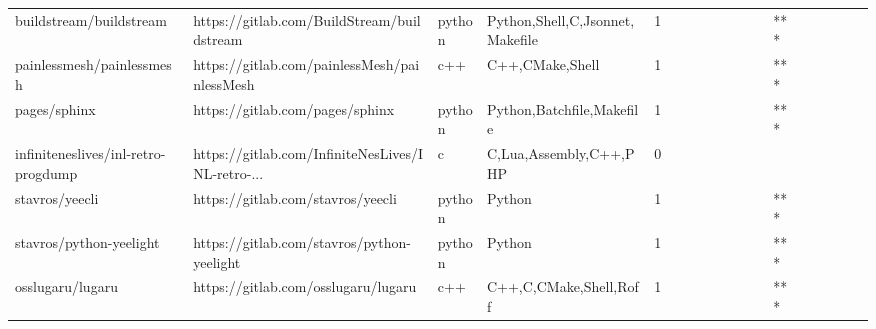 \begin{tabular}{llllrlllllllllllll}
buildstream/buildstream                            &         https://gitlab.com/BuildStream/buildstream &            python &                    Python,Shell,C,Jsonnet,Makefile &       1 &         &        &           &                &                 &        &           &       *** &          &          &       &              &          \\
painlessmesh/painlessmesh                          &       https://gitlab.com/painlessMesh/painlessMesh &               c++ &                                    C++,CMake,Shell &       1 &         &        &           &                &                 &        &           &       *** &          &          &       &              &          \\
pages/sphinx                                       &                    https://gitlab.com/pages/sphinx &            python &                          Python,Batchfile,Makefile &       1 &         &        &           &                &                 &        &           &       *** &          &          &       &              &          \\
infiniteneslives/inl-retro-progdump                &  https://gitlab.com/InfiniteNesLives/INL-retro-... &                 c &                             C,Lua,Assembly,C++,PHP &       0 &         &        &           &                &                 &        &           &           &          &          &       &              &          \\
stavros/yeecli                                     &                  https://gitlab.com/stavros/yeecli &            python &                                             Python &       1 &         &        &           &                &                 &        &           &       *** &          &          &       &              &          \\
stavros/python-yeelight                            &         https://gitlab.com/stavros/python-yeelight &            python &                                             Python &       1 &         &        &           &                &                 &        &           &       *** &          &          &       &              &          \\
osslugaru/lugaru                                   &                https://gitlab.com/osslugaru/lugaru &               c++ &                             C++,C,CMake,Shell,Roff &       1 &         &        &           &                &                 &        &           &       *** &          &          &       &              &          \\

\end{tabular}
